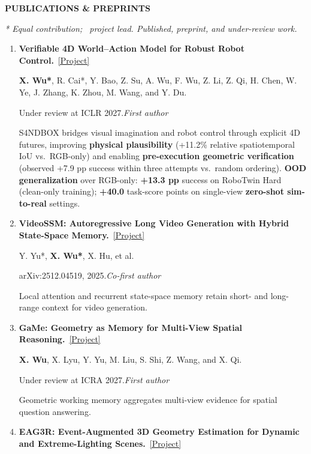 \documentclass[a4paper]{article}
\newcommand{\cvsection}[1]{%
  \par\vspace{2.0pt}%
  {\color{cvblue}\fontsize{11}{12.2}\selectfont\bfseries\MakeUppercase{#1}}\par
  \vspace{-4pt}{\color{cvblue}\rule{\textwidth}{0.4pt}}\par\vspace{1.0pt}%
}
\newcommand{\pubgroup}[1]{%
  \par\vspace{2.0pt}{\color{cvblue}\fontsize{9.4}{10.4}\selectfont\bfseries #1}\par
}
\newcommand{\pubnote}[1]{\par{\color{cvgray}#1}}
\begin{document}
\cvsection{Publications \& Preprints}
{\fontsize{9}{9.65}\selectfont
\textit{* Equal contribution; \textdagger\ project lead. Published, preprint, and under-review work.}\par
\pubgroup{First- and Co-first-author Work}
\begin{enumerate}[leftmargin=1.6em,labelsep=0.38em,itemsep=0.4pt,topsep=1.3pt,parsep=0pt,partopsep=0pt]
\item \textbf{Verifiable 4D World--Action Model for Robust Robot Control.}~\href{https://candy-crusher.github.io/xiaoshanwu.github.io/projects/sandbox/}{\textcolor{cvblue}{[Project]}}\par
\textbf{X. Wu*}, R. Cai*, Y. Bao, Z. Su, A. Wu, F. Wu, Z. Li, Z. Qi, H. Chen, W. Ye, J. Zhang, K. Zhou, M. Wang, and Y. Du.\par
Under review at ICLR 2027.\hfill\textcolor{cvblue}{\textit{First author}}
\pubnote{S4NDBOX bridges visual imagination and robot control through explicit 4D futures, improving \textbf{physical plausibility} (+11.2\% relative spatiotemporal IoU vs.\ RGB-only) and enabling \textbf{pre-execution geometric verification} (observed +7.9 pp success within three attempts vs.\ random ordering).} \textbf{OOD generalization} over RGB-only: \textbf{+13.3 pp} success on RoboTwin Hard (clean-only training); \textbf{+40.0} task-score points on single-view \textbf{zero-shot sim-to-real} settings.
\item \textbf{VideoSSM: Autoregressive Long Video Generation with Hybrid State-Space Memory.}~\href{https://candy-crusher.github.io/xiaoshanwu.github.io/projects/videossm/}{\textcolor{cvblue}{[Project]}}\par
Y. Yu*, \textbf{X. Wu*}, X. Hu, et al.\par
arXiv:2512.04519, 2025.\hfill\textcolor{cvblue}{\textit{Co-first author}}
\pubnote{Local attention and recurrent state-space memory retain short- and long-range context for video generation.}
\item \textbf{GaMe: Geometry as Memory for Multi-View Spatial Reasoning.}~\href{https://candy-crusher.github.io/xiaoshanwu.github.io/projects/game/}{\textcolor{cvblue}{[Project]}}\par
\textbf{X. Wu}, X. Lyu, Y. Yu, M. Liu, S. Shi, Z. Wang, and X. Qi.\par
Under review at ICRA 2027.\hfill\textcolor{cvblue}{\textit{First author}}
\pubnote{Geometric working memory aggregates multi-view evidence for spatial question answering.}
\item \textbf{EAG3R: Event-Augmented 3D Geometry Estimation for Dynamic and Extreme-Lighting Scenes.}~\href{https://candy-crusher.github.io/xiaoshanwu.github.io/projects/eag3r/}{\textcolor{cvblue}{[Project]}}\par

\end{enumerate}}
\end{document}
